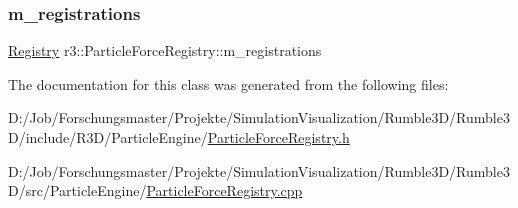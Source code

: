 \subsubsection{\texorpdfstring{m\+\_\+registrations}{m\_registrations}}
{\footnotesize\ttfamily \mbox{\hyperlink{classr3_1_1_particle_force_registry_a5529157176d2c10b2afde82e6871c7eb}{Registry}} r3\+::\+Particle\+Force\+Registry\+::m\+\_\+registrations\hspace{0.3cm}{\ttfamily [protected]}}



The documentation for this class was generated from the following files\+:\begin{DoxyCompactItemize}
\item 
D\+:/\+Job/\+Forschungsmaster/\+Projekte/\+Simulation\+Visualization/\+Rumble3\+D/\+Rumble3\+D/include/\+R3\+D/\+Particle\+Engine/\mbox{\hyperlink{_particle_force_registry_8h}{Particle\+Force\+Registry.\+h}}\item 
D\+:/\+Job/\+Forschungsmaster/\+Projekte/\+Simulation\+Visualization/\+Rumble3\+D/\+Rumble3\+D/src/\+Particle\+Engine/\mbox{\hyperlink{_particle_force_registry_8cpp}{Particle\+Force\+Registry.\+cpp}}\end{DoxyCompactItemize}
